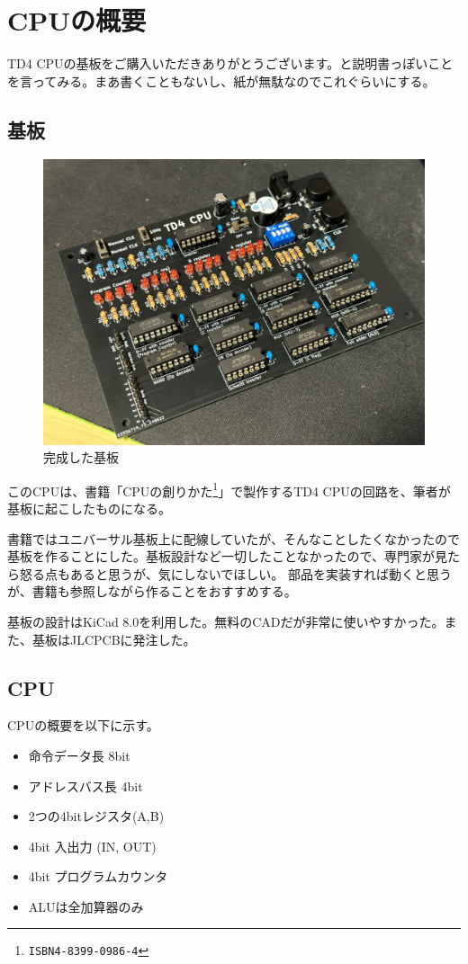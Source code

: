 \documentclass[xelatex,a5paper,ja=standard, openany]{bxjsbook}
\title{}
\author{}
\date{}
\begin{document}
\tableofcontents

\chapter{CPUの概要}

TD4 CPUの基板をご購入いただきありがとうございます。と説明書っぽいことを言ってみる。まあ書くこともないし、紙が無駄なのでこれぐらいにする。

\section{基板}

\begin{figure}[h]
    \centering
    \includegraphics[width=0.6\linewidth]{figure/kiban.jpeg}
    \caption{完成した基板}
    \label{fig:kanseikiban}
\end{figure}

このCPUは、書籍「CPUの創りかた\footnote{\texttt{ISBN4-8399-0986-4}}」で製作するTD4 CPUの回路を、筆者が基板に起こしたものになる。\par
書籍ではユニバーサル基板上に配線していたが、そんなことしたくなかったので基板を作ることにした。基板設計など一切したことなかったので、専門家が見たら怒る点もあると思うが、気にしないでほしい。
部品を実装すれば動くと思うが、書籍も参照しながら作ることをおすすめする。\par

基板の設計はKiCad 8.0を利用した。無料のCADだが非常に使いやすかった。また、基板はJLCPCBに発注した。
\section{CPU}
CPUの概要を以下に示す。

\begin{itemize}
    \item 命令データ長 8bit
    \item アドレスバス長 4bit
    \item 2つの4bitレジスタ(A,B)
    \item 4bit 入出力 (IN, OUT)
    \item 4bit プログラムカウンタ
    \item ALUは全加算器のみ
\end{itemize}
\end{document}
